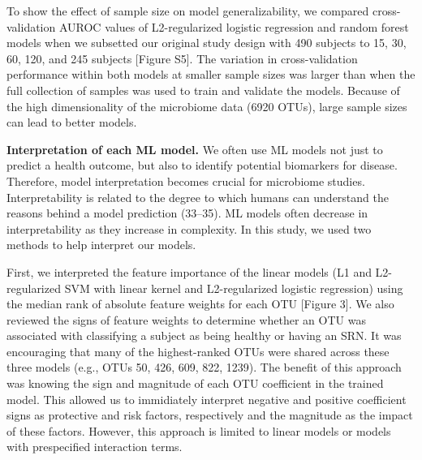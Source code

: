\documentclass[11pt,]{article}
\begin{document}
To show the effect of sample size on model generalizability, we compared
cross-validation AUROC values of L2-regularized logistic regression and
random forest models when we subsetted our original study design with
490 subjects to 15, 30, 60, 120, and 245 subjects {[}Figure S5{]}. The
variation in cross-validation performance within both models at smaller
sample sizes was larger than when the full collection of samples was
used to train and validate the models. Because of the high
dimensionality of the microbiome data (6920 OTUs), large sample sizes
can lead to better models.

\textbf{Interpretation of each ML model.} We often use ML models not
just to predict a health outcome, but also to identify potential
biomarkers for disease. Therefore, model interpretation becomes crucial
for microbiome studies. Interpretability is related to the degree to
which humans can understand the reasons behind a model prediction
(33--35). ML models often decrease in interpretability as they increase
in complexity. In this study, we used two methods to help interpret our
models.

First, we interpreted the feature importance of the linear models (L1
and L2-regularized SVM with linear kernel and L2-regularized logistic
regression) using the median rank of absolute feature weights for each
OTU {[}Figure 3{]}. We also reviewed the signs of feature weights to
determine whether an OTU was associated with classifying a subject as
being healthy or having an SRN. It was encouraging that many of the
highest-ranked OTUs were shared across these three models (e.g., OTUs
50, 426, 609, 822, 1239). The benefit of this approach was knowing the
sign and magnitude of each OTU coefficient in the trained model. This
allowed us to immidiately interpret negative and positive coefficient
signs as protective and risk factors, respectively and the magnitude as
the impact of these factors. However, this approach is limited to linear
models or models with prespecified interaction terms.
\end{document}
